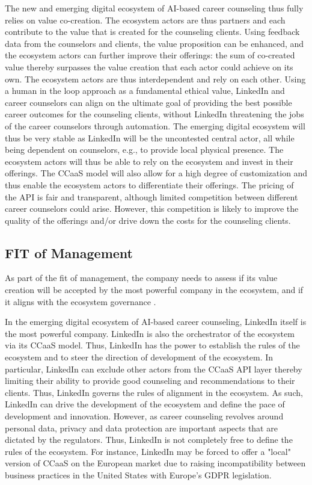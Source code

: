 The new and emerging digital ecosystem of AI-based career counseling thus fully relies on value co-creation.
The ecosystem actors are thus partners and each contribute
to the value that is created for the counseling clients. Using feedback data from the counselors and
clients, the value proposition can be enhanced, and the ecosystem actors can further improve their
offerings: the sum of co-created value thereby surpasses the value creation that each actor could
achieve on its own. The ecosystem actors are thus interdependent and rely on each other. Using a
human in the loop approach as a fundamental ethical value, LinkedIn and career counselors can align
on the ultimate goal of providing the best possible career outcomes for the counseling clients,
without LinkedIn threatening the jobs of the career counselors through automation. The emerging
digital ecosystem will thus be very stable as LinkedIn will be the uncontested central actor, all 
while being dependent on counselors, e.g., to provide local physical presence. The ecosystem actors
will thus be able to rely on the ecosystem and invest in their offerings. The CCaaS model will also
allow for a high degree of customization and thus enable the ecosystem actors to differentiate their
offerings. The pricing of the API is fair and transparent, although limited competition between
different career counselors could arise. However, this competition is likely to improve the quality
of the offerings and/or drive down the costs for the counseling clients. 

\subsection{FIT of Management}

As part of the fit of management, the company needs to assess if its value creation will be accepted by
the most powerful company in the ecosystem, and if it aligns with the ecosystem governance
\citep[p.~53]{griederDigitalEcosystemHow2019}.

In the emerging digital ecosystem of AI-based career counseling, LinkedIn itself is the most powerful company.
LinkedIn is also the orchestrator of the ecosystem via its CCaaS model. Thus, LinkedIn has the power 
to establish the rules of the ecosystem and to steer the direction of development of the ecosystem. In 
particular, LinkedIn can exclude other actors from the CCaaS API layer thereby limiting their ability
to provide good counseling and recommendations to their clients. Thus, LinkedIn governs the rules of 
alignment in the ecosystem. As such, LinkedIn can drive the development of the ecosystem and define 
the pace of development and innovation. However, as career counseling revolves around personal data,
privacy and data protection are important aspects that are dictated by the regulators. Thus, LinkedIn
is not completely free to define the rules of the ecosystem. For instance, LinkedIn may be forced to
offer a "local" version of CCaaS on the European market due to raising incompatibility between business 
practices in the United States with Europe's GDPR legislation.

